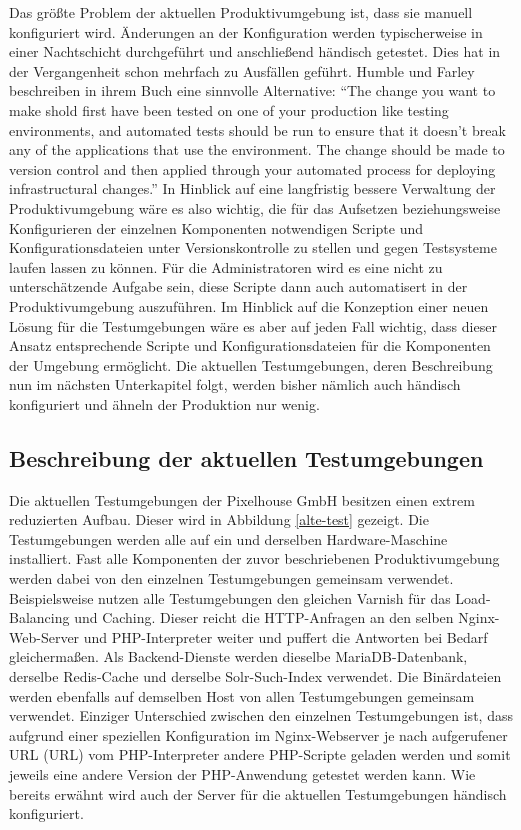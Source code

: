 Das größte Problem der aktuellen Produktivumgebung ist, dass sie manuell konfiguriert wird. Änderungen an der Konfiguration werden typischerweise in einer Nachtschicht durchgeführt und anschließend händisch getestet. Dies hat in der Vergangenheit schon mehrfach zu Ausfällen geführt. Humble und Farley beschreiben in ihrem Buch eine sinnvolle Alternative: "`The change you want to make shold first have been tested on one of your production like testing environments, and automated tests should be run to ensure that it doesn't break any of the applications that use the environment. The change should be made to version control and then applied through your automated process for deploying infrastructural changes."' \citep[S.][S. 287]{HumFar10} In Hinblick auf eine langfristig bessere Verwaltung der Produktivumgebung wäre es also wichtig, die für das Aufsetzen beziehungsweise Konfigurieren der einzelnen Komponenten notwendigen Scripte und Konfigurationsdateien unter Versionskontrolle zu stellen und gegen Testsysteme laufen lassen zu können. Für die Administratoren wird es eine nicht zu unterschätzende Aufgabe sein, diese Scripte dann auch automatisert in der Produktivumgebung auszuführen. Im Hinblick auf die Konzeption einer neuen Lösung für die Testumgebungen wäre es aber auf jeden Fall wichtig, dass dieser Ansatz entsprechende Scripte und Konfigurationsdateien für die Komponenten der Umgebung ermöglicht. Die aktuellen Testumgebungen, deren Beschreibung nun im nächsten Unterkapitel folgt, werden bisher nämlich auch händisch konfiguriert und ähneln der Produktion nur wenig.

\subsection{Beschreibung der aktuellen Testumgebungen}

Die aktuellen Testumgebungen der Pixelhouse GmbH besitzen einen extrem reduzierten Aufbau. Dieser wird in Abbildung \ref{alte-test} gezeigt. Die Testumgebungen werden alle auf ein und derselben Hardware-Maschine installiert. Fast alle Komponenten der zuvor beschriebenen Produktivumgebung werden dabei von den einzelnen Testumgebungen gemeinsam verwendet. Beispielsweise nutzen alle Testumgebungen den gleichen Varnish für das Load-Balancing und Caching. Dieser reicht die HTTP-Anfragen an den selben Nginx-Web-Server und PHP-Interpreter weiter und puffert die Antworten bei Bedarf gleichermaßen. Als Backend-Dienste werden dieselbe MariaDB-Datenbank, derselbe Redis-Cache und derselbe Solr-Such-Index verwendet. Die Binärdateien werden ebenfalls auf demselben Host von allen Testumgebungen gemeinsam verwendet. Einziger Unterschied zwischen den einzelnen Testumgebungen ist, dass aufgrund einer speziellen Konfiguration im Nginx-Webserver je nach aufgerufener URL (\acl{URL}) vom PHP-Interpreter andere PHP-Scripte geladen werden und somit jeweils eine andere Version der PHP-Anwendung getestet werden kann. Wie bereits erwähnt wird auch der Server für die aktuellen Testumgebungen händisch konfiguriert.

